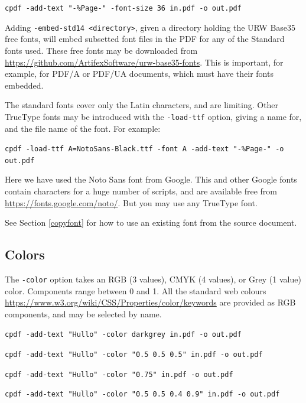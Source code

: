 \documentclass{book}
\begin{document}
  \begin{framed}
    \noindent\small\verb!cpdf -add-text "-%Page-" -font-size 36 in.pdf -o out.pdf!
  \end{framed}

  \noindent Adding \texttt{-embed-std14 <directory>}, given a directory holding the URW Base35 free fonts, will embed subsetted font files in the PDF for any of the Standard fonts used. These free fonts may be downloaded from \url{https://github.com/ArtifexSoftware/urw-base35-fonts}. This is important, for example, for PDF/A or PDF/UA documents, which must have their fonts embedded.

The standard fonts cover only the Latin characters, and are limiting. Other TrueType fonts may be introduced with the \texttt{-load-ttf} option, giving a name for, and the file name of the font. For example:

  \begin{framed}
    \noindent\small\verb!cpdf -load-ttf A=NotoSans-Black.ttf -font A -add-text "-%Page-" -o out.pdf!
  \end{framed}

\noindent Here we have used the Noto Sans font from Google. This and other Google fonts contain characters for a huge number of scripts, and are available free from \url{https://fonts.google.com/noto/}. But you may use any TrueType font.

See Section \ref{copyfont} for how to use an existing font from the source document.

  \subsection{Colors}
  The \texttt{-color} option takes an RGB (3 values), CMYK (4 values), or Grey (1 value) color. Components range between 0 and 1. All the standard web colours \url{https://www.w3.org/wiki/CSS/Properties/color/keywords} are provided as RGB components, and may be selected by name.

  \begin{framed}
    \noindent\small\verb!cpdf -add-text "Hullo" -color darkgrey in.pdf -o out.pdf!
    
    \vspace{1.5mm}
    \noindent\small\verb!cpdf -add-text "Hullo" -color "0.5 0.5 0.5" in.pdf -o out.pdf!

    \vspace{1.5mm}
    \noindent\small\verb!cpdf -add-text "Hullo" -color "0.75" in.pdf -o out.pdf!

    \vspace{1.5mm}
    \noindent\small\verb!cpdf -add-text "Hullo" -color "0.5 0.5 0.4 0.9" in.pdf -o out.pdf!
  \end{framed}
\end{document}
